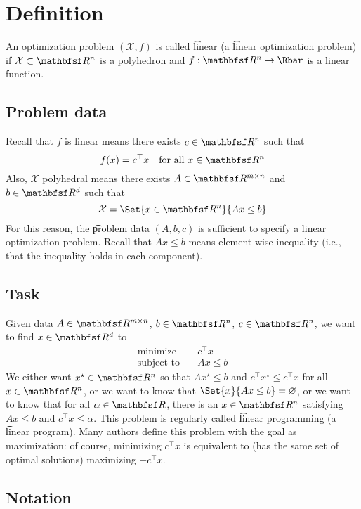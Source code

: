 
\section*{Definition}

An optimization problem $(\mathcal{X} , f)$ is called \t{linear} (a \t{linear optimization problem}) if $\mathcal{X}  \subset \R ^n$ is a polyhedron and $f: \R ^n \to \Rbar$ is a linear function.

\subsection*{Problem data}

Recall that $f$ is linear means there exists $c \in \R ^n$ such that
\[
f(x) = c^\top x \quad \text{for all } x \in \R ^n
\]
Also, $\mathcal{X} $ polyhedral means there exists $A \in \R ^{m \times  n}$ and $b \in \R ^{d}$ such that
\[
\mathcal{X}  = \Set{x \in \R ^n}{Ax \leq b}
\]
For this reason, the \t{problem data} $(A, b, c)$ is sufficient to specify a linear optimization problem.
Recall that $Ax \leq b$ means element-wise inequality (i.e., that the inequality holds in each component).

\subsection*{Task}

Given data $A \in \R ^{m \times  n}$, $b \in \R ^n$, $c \in \R ^n$, we want to find $x \in \R ^d$ to
\[
\begin{aligned}
\text{minimize} &\quad c^\top x \\
\text{subject to} &\quad Ax \leq b
\end{aligned}
\]
We either want $x^\star \in \R ^n$ so that $Ax^\star \leq b$ and $c^\top x^\star \leq c^\top  x$ for all $x \in \R ^n$, or we want to know that $\Set{x}{Ax \leq b} = \varnothing$, or we want to know that for all $\alpha  \in \R $, there is an $x \in \R ^n$ satisfying $Ax \leq b$ and $c^\top x \leq \alpha $.
This problem is regularly called \t{linear programming} (a \t{linear program}).
Many authors define this problem with the goal as maximization: of course, minimizing $c^\top x$ is equivalent to (has the same set of optimal solutions) maximizing $-c^\top x$.

\subsection*{Notation}

